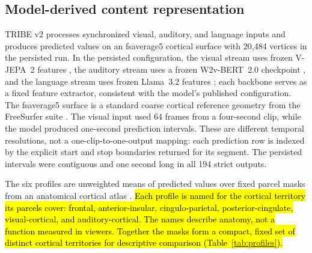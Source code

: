 \documentclass{ieeeaccess}
\newcommand{\rev}[1]{\hl{#1}}
\newcommand{\rev}[1]{#1}
\begin{document}
\subsection{Model-derived content representation}
TRIBE v2 processes synchronized visual, auditory, and language inputs \cite{dascoli2026tribev2} and produces predicted values on an fsaverage5 cortical surface with 20,484 vertices in the persisted run. In the persisted configuration, the visual stream uses frozen V-JEPA~2 features \cite{assran2025vjepa2}, the auditory stream uses a frozen W2v-BERT~2.0 checkpoint \cite{chung2021w2vbert}, and the language stream uses frozen Llama~3.2 features \cite{grattafiori2024llama3}; each backbone serves as a fixed feature extractor, consistent with the model's published configuration. The fsaverage5 surface is a standard coarse cortical reference geometry from the FreeSurfer suite \cite{fischl2012freesurfer}. The visual input used 64 frames from a four-second clip, while the model produced one-second prediction intervals. These are different temporal resolutions, not a one-clip-to-one-output mapping: each prediction row is indexed by the explicit start and stop boundaries returned for its segment. The persisted intervals were contiguous and one second long in all 194 strict outputs.

The six profiles are unweighted means of predicted values over fixed parcel masks from an anatomical cortical atlas \cite{destrieux2010parcellation}. \rev{Each profile is named for the cortical territory its parcels cover: frontal, anterior-insular, cingulo-parietal, posterior-cingulate, visual-cortical, and auditory-cortical. The names describe anatomy, not a function measured in viewers. Together the masks form a compact, fixed set of distinct cortical territories for descriptive comparison (\mbox{Table~\ref{tab:profiles}}).}
\end{document}
